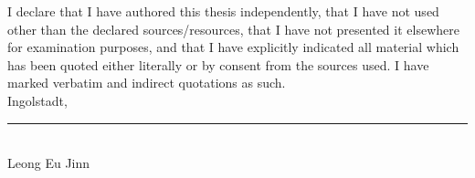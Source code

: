 
I declare that I have authored this thesis independently, that I have not used other than the declared sources/resources, that I have not presented it elsewhere for examination purposes, and that I have explicitly indicated all material which has been quoted either literally or by consent from the sources used. I have marked verbatim and indirect quotations as such.	\\[2em]
	
Ingolstadt, \rule{0.3\textwidth}{0.4pt}	\\ [1.5cm]
	
Leong Eu Jinn

